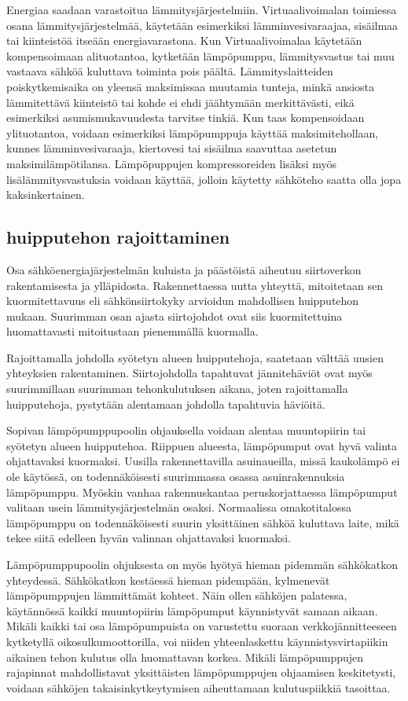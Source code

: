   Energiaa saadaan varastoitua lämmitysjärjestelmiin. Virtuaalivoimalan toimiessa osana lämmitysjärjestelmää, käytetään esimerkiksi lämminvesivaraajaa, sisäilmaa tai kiinteistöä itseään energiavarastona. Kun Virtuaalivoimalaa käytetään kompensoimaan alituotantoa, kytketään lämpöpumppu, lämmitysvastus tai muu vastaava sähköä kuluttava toiminta pois päältä. Lämmityslaitteiden poiskytkemisaika on yleensä maksimissaa muutamia tunteja, minkä ansiosta lämmitettävä kiinteistö tai kohde ei ehdi jäähtymään merkittävästi, eikä esimerkiksi asumismukavuudesta tarvitse tinkiä. Kun taas kompensoidaan ylituotantoa, voidaan esimerkiksi lämpöpumppuja käyttää maksimitehollaan, kunnes lämminvesivaraaja, kiertovesi tai sisäilma saavuttaa asetetun maksimilämpötilansa. Lämpöpuppujen kompressoreiden lisäksi myös lisälämmitysvastuksia voidaan käyttää, jolloin käytetty sähköteho saatta olla jopa kaksinkertainen.

\subsection{huipputehon rajoittaminen}

  Osa sähköenergiajärjestelmän kuluista ja päästöistä aiheutuu siirtoverkon rakentamisesta ja ylläpidosta. Rakennettaessa uutta yhteyttä, mitoitetaan sen kuormitettavuus eli sähkönsiirtokyky arvioidun mahdollisen huipputehon mukaan. Suurimman osan ajasta siirtojohdot ovat siis kuormitettuina huomattavasti mitoitustaan pienemmällä kuormalla.

  Rajoittamalla johdolla syötetyn alueen huipputehoja, saatetaan välttää uusien yhteyksien rakentaminen. Siirtojohdolla tapahtuvat jännitehäviöt ovat myös suurimmillaan suurimman tehonkulutuksen aikana, joten rajoittamalla huipputehoja, pystytään alentamaan johdolla tapahtuvia häviöitä.

  Sopivan lämpöpumppupoolin ohjauksella voidaan alentaa muuntopiirin tai syötetyn alueen huipputehoa. Riippuen alueesta, lämpöpumput ovat hyvä valinta ohjattavaksi kuormaksi. Uusilla rakennettavilla asuinaueilla, missä kaukolämpö ei ole käytössä, on todennäköisesti suurimmassa osassa asuinrakennuksia lämpöpumppu. Myöskin vanhaa rakennuskantaa peruskorjattaessa lämpöpumput valitaan usein lämmitysjärjestelmän osaksi. Normaalissa omakotitalossa lämpöpumppu on todennäköisesti suurin yksittäinen sähköä kuluttava laite, mikä tekee siitä edelleen hyvän valinnan ohjattavaksi kuormaksi.

  Lämpöpumppupoolin ohjuksesta on myös hyötyä hieman pidemmän sähkökatkon yhteydessä. Sähkökatkon kestäessä hieman pidempään, kylmenevät lämpöpumppujen lämmittämät kohteet. Näin ollen sähköjen palatessa, käytännössä kaikki muuntopiirin lämpöpumput käynnistyvät samaan aikaan. Mikäli kaikki tai osa lämpöpumpuista on varustettu suoraan verkkojännitteeseen kytketyllä oikosulkumoottorilla, voi niiden yhteenlaskettu käynnistysvirtapiikin aikainen tehon kulutus olla huomattavan korkea. Mikäli lämpöpumppujen rajapinnat mahdollistavat yksittäisten lämpöpumppujen ohjaamisen keskitetysti, voidaan sähköjen takaisinkytkeytymisen aiheuttamaan kulutuspiikkiä tasoittaa.


